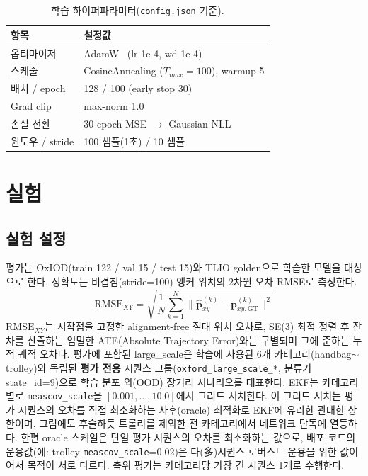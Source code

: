 \documentclass{kcc}
\begin{document}
\begin{table}[!htb]
\caption{학습 하이퍼파라미터(\texttt{config.json} 기준).}
\label{tab:hyper}
\centering\footnotesize
\begin{tabular}{@{}p{}p{}@{}}
\toprule
항목 & 설정값 \\ \midrule
옵티마이저 & AdamW~\cite{adamw} (lr 1e-4, wd 1e-4) \\
스케줄 & CosineAnnealing ($T_{max}{=}100$), warmup 5 \\
배치 / epoch & 128 / 100 (early stop 30) \\
Grad clip & max-norm 1.0 \\
손실 전환 & 30 epoch MSE $\to$ Gaussian NLL \\
윈도우 / stride & 100 샘플(1초) / 10 샘플 \\ \bottomrule
\end{tabular}
\end{table}

\section{실험}
\subsection{실험 설정}
평가는 OxIOD(train 122 / val 15 / test 15)와 TLIO golden으로 학습한 모델을 대상으로 한다. 정확도는 비겹침(stride=100) 앵커 위치의 2차원 오차 RMSE로 측정한다.
\begin{equation}
\mathrm{RMSE}_{XY}=\sqrt{\frac{1}{N}\sum_{k=1}^{N}\lVert\hat{\mathbf{p}}^{(k)}_{xy}-\mathbf{p}^{(k)}_{xy,\mathrm{GT}}\rVert^2}
\end{equation}
$\mathrm{RMSE}_{XY}$는 시작점을 고정한 alignment-free 절대 위치 오차로, SE(3) 최적 정렬 후 잔차를 산출하는 엄밀한 ATE(Absolute Trajectory Error)와는 구별되며 그에 준하는 누적 궤적 오차다. 평가에 포함된 large\_scale은 학습에 사용된 6개 카테고리(handbag$\sim$trolley)와 독립된 \textbf{평가 전용} 시퀀스 그룹(\texttt{oxford\_large\_scale\_*}, 분류기 state\_id=9)으로 학습 분포 외(OOD) 장거리 시나리오를 대표한다. EKF는 카테고리별로 \texttt{meascov\_scale}을 $[0.001,\ldots,10.0]$에서 그리드 서치한다. 이 그리드 서치는 평가 시퀀스의 오차를 직접 최소화하는 사후(oracle) 최적화로 EKF에 유리한 관대한 상한이며, 그럼에도 후술하듯 트롤리를 제외한 전 카테고리에서 네트워크 단독에 열등하다. 한편 oracle 스케일은 단일 평가 시퀀스의 오차를 최소화하는 값으로, 배포 코드의 운용값(예: trolley \texttt{meascov\_scale}=0.02)은 다(多)시퀀스 로버스트 운용을 위한 값이어서 목적이 서로 다르다. 측위 평가는 카테고리당 가장 긴 시퀀스 1개로 수행한다.
\end{document}
